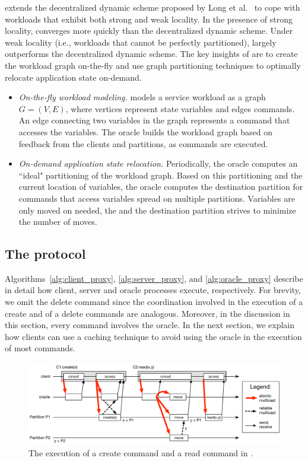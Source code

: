 \dynastar extends the decentralized dynamic scheme proposed by Long et al.~\cite{hoang2016} to cope with workloads that exhibit both strong and weak locality.
In the presence of strong locality, \dynastar converges more quickly than the decentralized dynamic scheme.
Under weak locality (i.e., workloads that cannot be perfectly partitioned), \dynastar largely outperforms the decentralized dynamic scheme.
The key insights of \dynastar are to create the workload graph on-the-fly and use graph partitioning techniques to optimally relocate application state on-demand.
\begin{itemize}
\item \emph{On-the-fly workload modeling.}
\dynastar models a service workload as a graph $G = (V, E)$, where vertices represent state variables and edges commands.
An edge connecting two variables in the graph represents a command that accesses the variables. 
The oracle builds the workload graph based on feedback from the clients and partitions, as commands are executed.
\item \emph{On-demand application state relocation.}
Periodically, the oracle computes an ``ideal" partitioning of the workload graph.
Based on this partitioning and the current location of variables, the oracle computes the destination partition for commands that access variables spread on multiple partitions.
Variables are only moved on needed, the and the destination partition strives to minimize the number of moves. 
\end{itemize}




\subsection{The \dynastar protocol}

Algorithms~\ref{alg:client_proxy}, \ref{alg:server_proxy}, and \ref{alg:oracle_proxy} describe in detail how client, server and oracle processes execute, respectively.
For brevity, we omit the delete command since the coordination involved in the execution of a create and of a delete commands are analogous. 
Moreover, in the discussion in this section, every command involves the oracle.
In the next section, we explain how clients can use a caching technique to avoid using the oracle in the execution of most commands.

\begin{figure}
\begin{minipage}[b]{1\linewidth} %
\centering
      \includegraphics[width=0.9\linewidth]{figures/dynastar}
\end{minipage}
\caption{The execution of a create command and a read command in \dynastar.}
\label{fig:oracle_repartition}
\end{figure}

